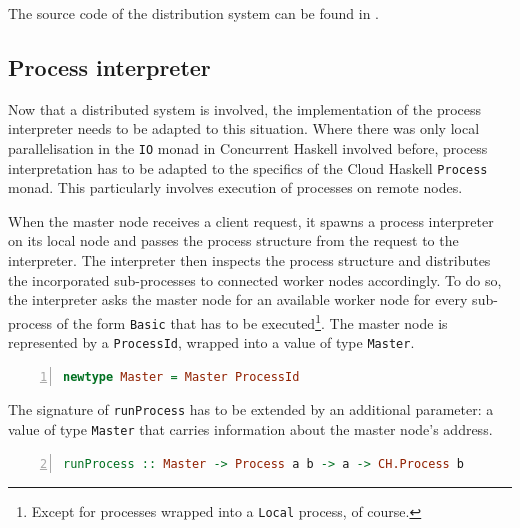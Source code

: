The source code of the distribution system can be found in .


\subsection{Process interpreter}
\label{chp:interpreter}
Now that a distributed system is involved, the implementation of the process interpreter needs to be adapted to this situation. Where there was only local parallelisation in the \texttt{IO} monad in \textsf{Concurrent Haskell} involved before, process interpretation has to be adapted to the specifics of the \textsf{Cloud Haskell} \texttt{Process} monad. This particularly involves execution of processes on remote nodes.

When the master node receives a client request, it spawns a process interpreter on its local node and passes the process structure from the request to the interpreter. The interpreter then inspects the process structure and distributes the incorporated sub-processes to connected worker nodes accordingly. To do so, the interpreter asks the master node for an available worker node for every sub-process of the form \texttt{Basic} that has to be executed\footnote{Except for processes wrapped into a \texttt{Local} process, of course.}. The master node is represented by a \texttt{ProcessId}, wrapped into a value of type \texttt{Master}.
\begin{lstlisting}[language=Haskell,caption=Data type for the representation of the address of the master node.,numbers=left,frame=bt]
newtype Master = Master ProcessId
\end{lstlisting}

The signature of \texttt{runProcess} has to be extended by an additional parameter: a value of type \texttt{Master} that carries information about the master node's address.
\begin{lstlisting}[language=Haskell,caption=Signature of the process interpreter implemented using \textsf{Cloud Haskell}.,label=lst:interpreter_signature,numbers=left,frame=bt,firstnumber=2]
runProcess :: Master -> Process a b -> a -> CH.Process b
\end{lstlisting}

